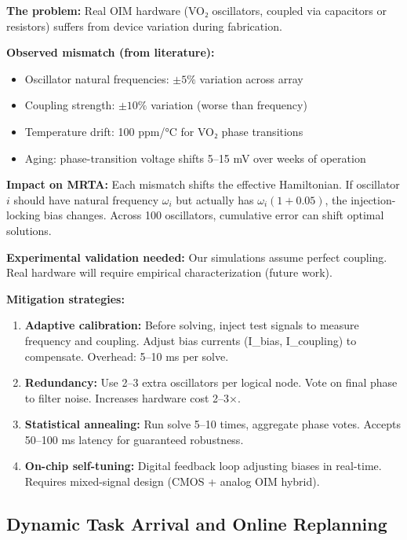 \textbf{The problem:} Real OIM hardware (VO₂ oscillators, coupled via capacitors or resistors) suffers from device variation during fabrication.

\textbf{Observed mismatch (from literature):}
\begin{itemize}
\item Oscillator natural frequencies: $\pm 5\%$ variation across array
\item Coupling strength: $\pm 10\%$ variation (worse than frequency)
\item Temperature drift: 100 ppm/°C for VO₂ phase transitions
\item Aging: phase-transition voltage shifts 5--15 mV over weeks of operation
\end{itemize}

\textbf{Impact on MRTA:} Each mismatch shifts the effective Hamiltonian. If oscillator $i$ should have natural frequency $\omega_i$ but actually has $\omega_i (1 + 0.05)$, the injection-locking bias changes. Across 100 oscillators, cumulative error can shift optimal solutions.

\textbf{Experimental validation needed:} Our simulations assume perfect coupling. Real hardware will require empirical characterization (future work).

\textbf{Mitigation strategies:}
\begin{enumerate}
\item \textbf{Adaptive calibration:} Before solving, inject test signals to measure frequency and coupling. Adjust bias currents (I_bias, I_coupling) to compensate. Overhead: 5--10 ms per solve.

\item \textbf{Redundancy:} Use 2--3 extra oscillators per logical node. Vote on final phase to filter noise. Increases hardware cost 2--3×.

\item \textbf{Statistical annealing:} Run solve 5--10 times, aggregate phase votes. Accepts 50--100 ms latency for guaranteed robustness.

\item \textbf{On-chip self-tuning:} Digital feedback loop adjusting biases in real-time. Requires mixed-signal design (CMOS + analog OIM hybrid).
\end{enumerate}

\subsection{Dynamic Task Arrival and Online Replanning}

